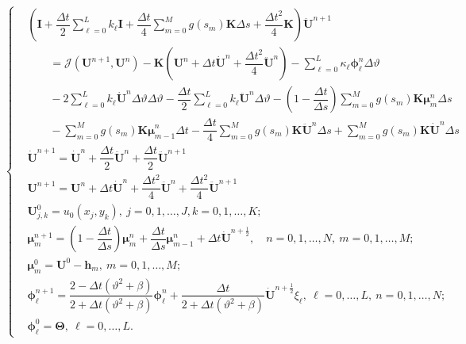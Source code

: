 \documentclass[12pt]{article}
\numberwithin{equation}{section}
\begin{document}
\begin{equation}\label{esq_num}
\begin{cases}
        &\displaystyle \left( \boldsymbol{I} + \dfrac{\Delta t}{2} \sum\limits_{\ell=0}^L k_\ell \boldsymbol{I} + \dfrac{\Delta t}{4} \sum\limits_{m=0}^M g(s_m) \boldsymbol{K} \Delta s + \dfrac{\Delta t^2}{4}\boldsymbol{K} \right)\boldsymbol{\ddot{U}}^{n+1}  \\
        &\displaystyle \qquad = \mathcal{J}(\boldsymbol{U}^{n+1},\boldsymbol{U}^n) - \boldsymbol{K}\left(\boldsymbol{U}^n + \Delta t \boldsymbol{\dot{U}}^n + \dfrac{\Delta t^2}{4}\boldsymbol{\ddot{U}}^n \right) - \sum\limits_{\ell=0}^L\kappa_\ell \boldsymbol{\phi}_\ell^n \Delta \vartheta \\
        &\displaystyle \qquad - 2\sum\limits_{\ell=0}^L k_\ell \boldsymbol{\dot{U}}^{n} \Delta \vartheta \Delta \vartheta - \dfrac{\Delta t }{2} \sum\limits_{\ell=0}^L k_\ell \boldsymbol{\ddot{U}}^{n} \Delta \vartheta 
        - \left(1-\dfrac{\Delta t}{\Delta s} \right)\sum\limits_{m=0}^M g(s_m) \boldsymbol{K}  \boldsymbol{\mu}_m^{n} \Delta s \\
        & \displaystyle \qquad - \sum\limits_{m=0}^M g(s_m)\boldsymbol{K\mu}_{m-1}^{n}\Delta t  - \dfrac{\Delta t}{4} \sum\limits_{m=0}^M g(s_m) \boldsymbol{K}\boldsymbol{\ddot{U}}^n\Delta s + \sum\limits_{m=0}^M g(s_m) \boldsymbol{K \dot{U}}^n \Delta s \\
        & \boldsymbol{\dot{U}}^{n+1} = \boldsymbol{\dot{U}}^{n}+ \dfrac{\Delta t}{2}\boldsymbol{\ddot U}^{n} + \dfrac{\Delta t}{2}\boldsymbol{\ddot U}^{n+1} \\
        & \boldsymbol{U}^{n+1} = \boldsymbol{U}^{n} + \Delta t \boldsymbol{\dot{U}}^{n} + \dfrac{\Delta t^2}{4}\boldsymbol{\ddot{U}}^{n} + \dfrac{\Delta t^2}{4}\boldsymbol{\ddot{U}}^{n+1} \\
        & \boldsymbol{U}_{j,k}^0 = u_0(x_j,y_k),\: j=0,1,\dots,J, k = 0,1,\dots,K; \\
        &\boldsymbol{\mu}_{m}^{n+1} = \left(1-\dfrac{\Delta t}{\Delta s} \right)\boldsymbol{\mu}_{m}^{n} +\dfrac{\Delta t}{\Delta s}\boldsymbol{\mu}_{m-1}^{n} + \Delta t \boldsymbol{\dot{U}}^{n+\frac12}, \quad n=0,1,\dots,N,\: m=0,1,\dots,M; \\
        &\boldsymbol{\mu}_{m}^{0} = \boldsymbol{U}^0 - \boldsymbol{h}_m,\: m=0,1,\dots,M; \\
        &\boldsymbol{\phi}_\ell^{n+1} = \dfrac{2-\Delta t(\vartheta^2+\beta)}{2+\Delta t(\vartheta^2+\beta)}\boldsymbol{\phi}_\ell^n + \dfrac{\Delta t}{2+\Delta t(\vartheta^2 + \beta)}\boldsymbol{\dot{U}}^{n+\frac12}\xi_\ell,\: \ell = 0,\dots,L,\: n=0,1,\dots,N; \\
&\boldsymbol{\phi}_\ell^{0} = \boldsymbol{\Theta},\: \ell = 0,\dots,L.
\end{cases}
\end{equation}
\end{document}
